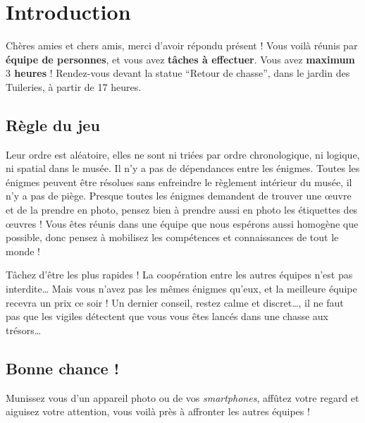 \chapter{Introduction}

\vspace*{-30pt}

Chères amies et chers amis, merci d'avoir répondu présent !
%
Vous voilà réunis par \textbf{équipe de \nbparequipe{} personnes},
et vous avez \textbf{\nbenigmes{} tâches à effectuer}.
%
Vous avez \textbf{maximum $3$ heures} !
%
Rendez-vous devant la statue ``Retour de chasse'', dans le jardin des Tuileries, à partir de 17 heures.


\section*{Règle du jeu}

Leur ordre est aléatoire, elles ne sont ni triées par ordre chronologique, ni logique, ni spatial dans le musée. Il n'y a pas de dépendances entre les énigmes.
%
Toutes les énigmes peuvent être résolues sans enfreindre le règlement intérieur du musée, il n'y a pas de piège.
Presque toutes les énigmes demandent de trouver une œuvre et de la prendre en photo, pensez bien à prendre aussi en photo les étiquettes des œuvres !
%
Vous êtes réunis dans une équipe que nous espérons aussi homogène que possible, donc pensez à mobilisez les compétences et connaissances de tout le monde !

Tâchez d'être les plus rapides ! La coopération entre les autres équipes n'est pas interdite…
Mais vous n'avez pas les mêmes énigmes qu'eux, et la meilleure équipe recevra un prix ce soir !
%
Un dernier conseil, restez calme et discret…, il ne faut pas que les vigiles détectent que vous vous êtes lancés dans une chasse aux trésors…


\section*{Bonne chance !}
Munissez vous d'un appareil photo ou de vos \emph{smartphones}, affûtez votre regard et aiguisez votre attention, vous voilà près à affronter les autres équipes !
